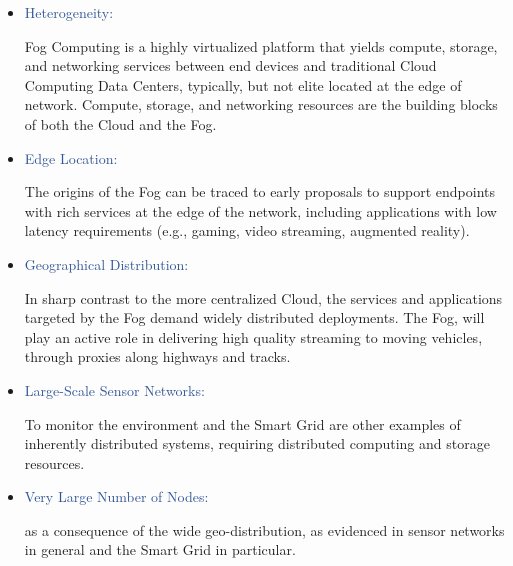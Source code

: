 \documentclass[11pt]{article}
\begin{document}
\vspace{1\baselineskip}
\begin{itemize}
\item {\Large \textcolor[HTML]{2F5496}{Heterogeneity:}}
{\large Fog Computing is a highly virtualized platform that yields compute, storage, and networking services between end devices and traditional Cloud Computing Data Centers, typically, but not elite located at the edge of network. Compute, storage, and networking resources are the building blocks of both the Cloud and the Fog.\par}
\end{itemize}

\vspace{1\baselineskip}
\begin{itemize}
\item {\Large \textcolor[HTML]{2F5496}{Edge Location:}}
{\large The origins of the Fog can be traced to early proposals to support endpoints with rich services at the edge of the network, including applications with low latency requirements (e.g., gaming, video streaming, augmented reality).\par}
\end{itemize}



\newpage

\begin{itemize}
\item {\Large \textcolor[HTML]{2F5496}{Geographical Distribution:}}
{\large In sharp contrast to the more centralized Cloud, the services and applications targeted by the Fog demand widely distributed deployments. The Fog, will play an active role in delivering high quality streaming to moving vehicles, through proxies along highways and tracks.\par}
\end{itemize}

\vspace{1\baselineskip}
\begin{itemize}
\item {\Large \textcolor[HTML]{2F5496}{Large-Scale Sensor Networks:}}
{\large To monitor the environment and the Smart Grid are other examples of inherently distributed systems, requiring distributed computing and storage resources.\par}
\end{itemize}

\vspace{1\baselineskip}
\begin{itemize}
\item {\Large \textcolor[HTML]{2F5496}{Very Large Number of Nodes:}}
{\large as a consequence of the wide geo-distribution, as evidenced in sensor networks in general and the Smart Grid in particular.\par}
\end{itemize}
\end{document}
